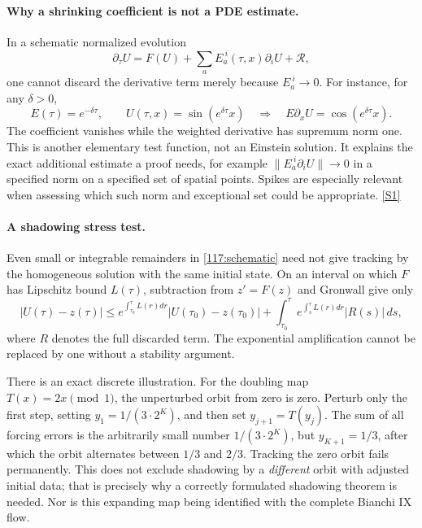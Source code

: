 \documentclass[11pt,a4paper]{article}
\newcommand{\sref}[2]{\hyperlink{source:#1:#2}{[S#2]}}
\numberwithin{equation}{section}
\begin{document}
\paragraph{Why a shrinking coefficient is not a PDE estimate.}
In a schematic normalized evolution
\begin{equation}\label{117:schematic}
 \partial_\tau U=F(U)+\sum_a E_a^{\ i}(\tau,x)\partial_iU+\mathcal R,
\end{equation}
one cannot discard the derivative term merely because $E_a^{\ i}\to0$.
For instance, for any $\delta>0$,
\[
 E(\tau)=e^{-\delta\tau},\qquad
 U(\tau,x)=\sin(e^{\delta\tau}x)
 \quad\Longrightarrow\quad
 E\partial_xU=\cos(e^{\delta\tau}x).
\]
The coefficient vanishes while the weighted derivative has supremum norm one.
This is another elementary test function, not an Einstein solution. It
explains the exact additional estimate a proof needs, for example
$\|E_a^{\ i}\partial_iU\|\to0$ in a specified norm on a specified set of spatial
points. Spikes are especially relevant when assessing which such norm and
exceptional set could be appropriate. \sref{117}{1}

\paragraph{A shadowing stress test.}
Even small or integrable remainders in \eqref{117:schematic} need not give
tracking by the homogeneous solution with the same initial state. On an
interval on which $F$ has Lipschitz bound $L(\tau)$, subtraction from
$z'=F(z)$ and Gronwall give only
\begin{equation}\label{117:gronwall}
 |U(\tau)-z(\tau)|\le
 e^{\int_{\tau_0}^\tau L(r)dr}|U(\tau_0)-z(\tau_0)|
 +\int_{\tau_0}^\tau e^{\int_s^\tau L(r)dr}|R(s)|\,ds,
\end{equation}
where $R$ denotes the full discarded term. The exponential amplification
cannot be replaced by one without a stability argument.

There is an exact discrete illustration. For the doubling map
$T(x)=2x\pmod1$, the unperturbed orbit from zero is zero. Perturb only the
first step, setting $y_1=1/(3\cdot2^K)$, and then set $y_{j+1}=T(y_j)$.
The sum of all forcing errors is the arbitrarily small number
$1/(3\cdot2^K)$, but $y_{K+1}=1/3$, after which the orbit alternates between
$1/3$ and $2/3$. Tracking the zero orbit fails permanently. This does not
exclude shadowing by a \emph{different} orbit with adjusted initial data;
that is precisely why a correctly formulated shadowing theorem is needed.
Nor is this expanding map being identified with the complete Bianchi IX
flow.
\end{document}
